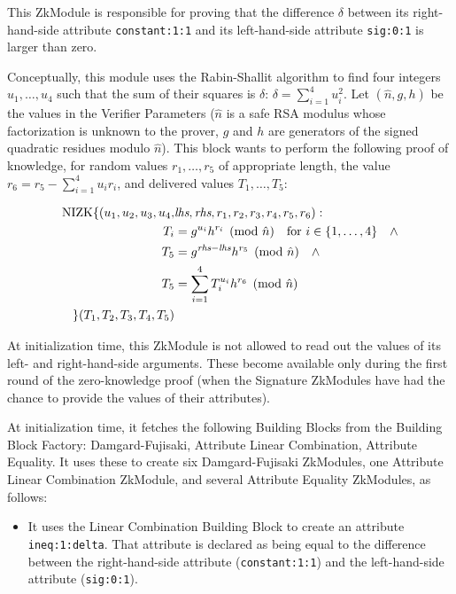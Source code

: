 \begin{itemize}
This ZkModule is responsible for proving that the difference $\delta$ between its
right-hand-side attribute \texttt{constant:1:1} and its
left-hand-side
attribute \texttt{sig:0:1}
is larger than zero.

Conceptually, this module uses the Rabin-Shallit algorithm to find four integers $u_1, \ldots, u_4$ such
that the sum of their squares is $\delta$: $\delta = \sum_{i=1}^4 u_i^2$.
Let $(\hat n, g, h)$ be the values in the Verifier Parameters ($\hat n$ is a safe RSA modulus whose factorization
is unknown to the prover, $g$ and $h$ are generators of the signed quadratic residues modulo $\hat n$).
This block wants to perform the following proof of knowledge, for random
values $r_1, \ldots, r_5$ of appropriate length, the value $r_6 = r_5 - \sum_{i=1}^4u_ir_i$,
and delivered values $T_1, \ldots, T_5$:

\begin{align}
\label{eq:ex:rangeProof}
\operatorname{NIZK}\lbrace(u_1, u_2, u_3, u_4, &\emph{lhs}, \emph{rhs}, r_1, r_2, r_3, r_4, r_5, r_6): \nonumber\\
T_i &= g^{u_i} h^{r_i} \pmod{\hat n}\quad\mbox{for }i \in \lbrace1, \ldots,  4\rbrace \quad\wedge\nonumber\\
T_5 &= g^{\emph{rhs}-\emph{lhs}} h^{r_5} \pmod{\hat n}\quad\wedge\nonumber\\
T_5 &= \sum_{i=1}^4 T_i^{u_i} h^{r_6} \pmod{\hat n} \nonumber\\
\rbrace(T_1, T_2, T_3, T_4, T_5)&
\end{align}

At initialization time, this ZkModule is not allowed to read out the values of its left- and right-hand-side
arguments. These become available only during the first round of the zero-knowledge proof
(when the Signature ZkModules have had the chance to provide the values of their attributes).

At initialization time, it fetches the following Building Blocks from the Building Block Factory: Damgard-Fujisaki, Attribute Linear Combination, Attribute Equality.
It uses these to create six Damgard-Fujisaki ZkModules, one Attribute Linear Combination ZkModule,
and several Attribute Equality ZkModules, as follows:
\begin{itemize}
\item It uses the Linear Combination Building Block to create an attribute \texttt{ineq:1:delta}. That attribute
is declared as being equal to the difference between the right-hand-side attribute (\texttt{constant:1:1}) and
the left-hand-side attribute (\texttt{sig:0:1}).


\end{itemize}
\end{itemize}
